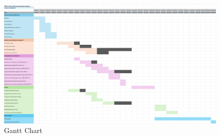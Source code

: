 \begin{landscape}
\label{app:appendix-f}
\setcounter{figure}{0}
\setcounter{table}{0} 
    \begin{figure}[H]
        \centering
        \includegraphics[width=23cm]{Images/gantt.png}
        \caption{Gantt Chart}
        \label{fig:gantt-chart}
    \end{figure}
\end{landscape}

\newpage

